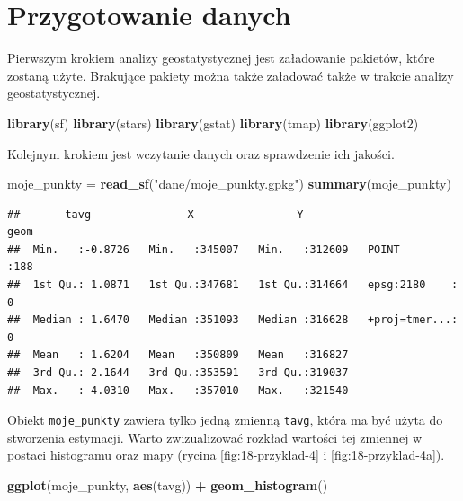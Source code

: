 \documentclass[
  paper=6in:9in,pagesize=pdftex,headinclude=on,footinclude=on,10pt]{scrbook}
\newenvironment{Shaded}{\begin{snugshade}}{\end{snugshade}}
\newcommand{\FunctionTok}[1]{\textcolor[rgb]{0.13,0.29,0.53}{\textbf{#1}}}
\newcommand{\NormalTok}[1]{#1}
\newcommand{\OtherTok}[1]{\textcolor[rgb]{0.56,0.35,0.01}{#1}}
\newcommand{\SpecialCharTok}[1]{\textcolor[rgb]{0.81,0.36,0.00}{\textbf{#1}}}
\newcommand{\StringTok}[1]{\textcolor[rgb]{0.31,0.60,0.02}{#1}}
\begin{document}
\section{Przygotowanie danych}\label{przygotowanie-danych}

Pierwszym krokiem analizy geostatystycznej jest załadowanie pakietów, które zostaną użyte.
Brakujące pakiety można także załadować także w trakcie analizy geostatystycznej.

\begin{Shaded}
\begin{Highlighting}[]
\FunctionTok{library}\NormalTok{(sf)}
\FunctionTok{library}\NormalTok{(stars)}
\FunctionTok{library}\NormalTok{(gstat)}
\FunctionTok{library}\NormalTok{(tmap)}
\FunctionTok{library}\NormalTok{(ggplot2)}
\end{Highlighting}
\end{Shaded}

Kolejnym krokiem jest wczytanie danych oraz sprawdzenie ich jakości.

\begin{Shaded}
\begin{Highlighting}[]
\NormalTok{moje\_punkty }\OtherTok{=} \FunctionTok{read\_sf}\NormalTok{(}\StringTok{"dane/moje\_punkty.gpkg"}\NormalTok{)}
\FunctionTok{summary}\NormalTok{(moje\_punkty)}
\end{Highlighting}
\end{Shaded}

\begin{verbatim}
##       tavg               X                Y                     geom    
##  Min.   :-0.8726   Min.   :345007   Min.   :312609   POINT        :188  
##  1st Qu.: 1.0871   1st Qu.:347681   1st Qu.:314664   epsg:2180    :  0  
##  Median : 1.6470   Median :351093   Median :316628   +proj=tmer...:  0  
##  Mean   : 1.6204   Mean   :350809   Mean   :316827                      
##  3rd Qu.: 2.1644   3rd Qu.:353591   3rd Qu.:319037                      
##  Max.   : 4.0310   Max.   :357010   Max.   :321540
\end{verbatim}

Obiekt \texttt{moje\_punkty} zawiera tylko jedną zmienną \texttt{tavg}, która ma być użyta do stworzenia estymacji.
Warto zwizualizować rozkład wartości tej zmiennej w postaci histogramu oraz mapy (rycina \ref{fig:18-przyklad-4} i \ref{fig:18-przyklad-4a}).

\begin{Shaded}
\begin{Highlighting}[]
\FunctionTok{ggplot}\NormalTok{(moje\_punkty, }\FunctionTok{aes}\NormalTok{(tavg)) }\SpecialCharTok{+} \FunctionTok{geom\_histogram}\NormalTok{()}
\end{Highlighting}
\end{Shaded}
\end{document}
